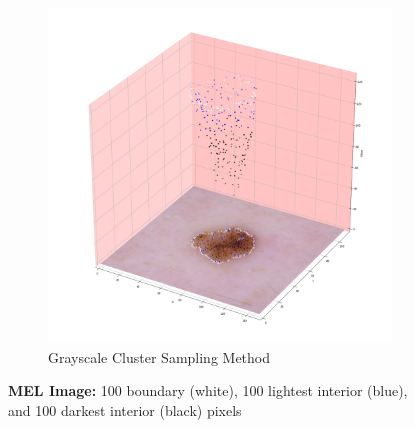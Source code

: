 \documentclass[11pt, reqno]{amsart}
\theoremstyle{plain}
\theoremstyle{definition}
\begin{document}
\begin{figure}
\begin{subfigure}{.5\textwidth}
  \includegraphics[width=\linewidth]{cluster_mel4.png}
  \caption{Grayscale Cluster Sampling Method}
\end{subfigure}
\caption{{\bfseries MEL Image:} 100 boundary (white), 100 lightest interior (blue), and 100 darkest interior (black) pixels}
\label{fig:mel}
\end{figure}
\end{document}
